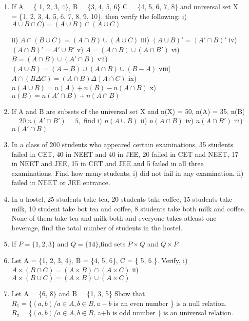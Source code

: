 \documentclass[14pt]{article}
\begin{document}
\begin{multicols}{2}
\begin{enumerate}[resume]
\item  If A = \{ 1, 2, 3, 4\}, B = \{3, 4, 5, 6\}
		  C = \{4, 5, 6, 7, 8\} and universal set  X = \{1, 2, 3, 4, 5, 6, 7, 8, 9, 10\}, then verify
the following:
i)		$ A \cup B\cap C) = (A\cup B) \cap (A \cup C)$

ii)	$A\cap (B\cup C)=(A\cap B)\cup (A \cup C)$
iii) $(A\cup B)' = (A'\cap B)'         $
iv)	$ (A\cap B)' = A'\cup B'          $
v)	$	 A = (A\cap B)\cup (A\cap B') $
vi)	$	 B = (A\cap B)\cup (A'\cap B) $
vii) $(A\cup B)=(A-B)\cup (A\cap B)\cup (B-A)$
viii)	$A \cap (B\Delta C) = (A\cap B) \Delta (A\cap C)$
ix) $n (A\cup B) = n(A) + n(B) - n(A\cap B)$ 
x) $n (B) = n(A'\cap B) + n(A\cap B)$

\item If A and B are subsets of the universal set X and n(X) = 50, n(A) = 35, n(B) = 20,$ n(A'\cap B') = 5,$ find i) $n (A\cup B)$ ii) $n(A\cap B)$
iv) $ n(A\cap B')$
iii) $ n(A'\cap B) $

\item In a class of 200 students who appeared
certain examinations, 35 students failed
in CET, 40 in NEET and 40 in JEE,
20 failed in CET and NEET, 17 in NEET
and JEE, 15 in CET and JEE and 5 failed
in all three examinations. Find how many
students,
i)	did not fail in any examination.
ii) failed in NEET or JEE entrance.
		 
		 
\item In a hostel, 25 students take tea, 20 students
take coffee, 15 students take milk, 10
student take bot tea and coffee, 8 students
take both milk and coffee. None of them
take tea and milk both and everyone takes
atleast one beverage, find the total number
of students in the hostel.

\item If $P = \{1, 2, 3 \} $ and $Q = \{14 \}$,find sets $P \times Q $ and $Q \times P$

\item Let A = \{1, 2, 3, 4\}, B = \{4, 5, 6\}, C = \{ 5, 6 \}.
 Verify, i) $A \times (B \cap C) = (A \times B) \cap (A \times C)$				
ii) $ A \times (B \cup C) = (A \times B) \cup (A \times C)$

\item Let A = \{6, 8\} and B = \{1, 3, 5\} Show that $ R_1 = \{ (a, b) / a \in A, b\in B, a - b$
is an even number \} is a null relation.
$R_2 = \{(a, b)/a \in A, b \in B$, a+b is odd number \}
is an universal relation.
\end{enumerate} 



\end{multicols}
 
\end{document}

